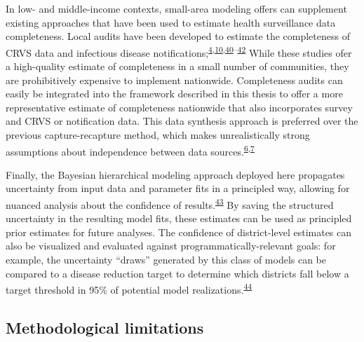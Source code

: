 \documentclass[
]{article}
\begin{document}
In low- and middle-income contexts, small-area modeling offers can supplement existing approaches that have been used to estimate health surveillance data completeness. Local audits have been developed to estimate the completeness of CRVS data and infectious disease notifications;\textsuperscript{\protect\hyperlink{ref-DeFrias2013}{4},\protect\hyperlink{ref-Hernandez2012}{10},\protect\hyperlink{ref-Szwarcwald2014}{40}--\protect\hyperlink{ref-NationalAdminstrativeDepartmentofStatisticsDANE2006}{42}} While these studies ofer a high-quality estimate of completeness in a small number of communities, they are prohibitively expensive to implement nationwide. Completeness audits can easily be integrated into the framework described in this thesis to offer a more representative estimate of completeness nationwide that also incorporates survey and CRVS or notification data. This data synthesis approach is preferred over the previous capture-recapture method, which makes unrealistically strong assumptions about independence between data sources.\textsuperscript{\protect\hyperlink{ref-Tilling2001}{6},\protect\hyperlink{ref-Cormack1999}{7}}

Finally, the Bayesian hierarchical modeling approach deployed here propagates uncertainty from input data and parameter fits in a principled way, allowing for nuanced analysis about the confidence of results.\textsuperscript{\protect\hyperlink{ref-McElreath2016}{43}} By saving the structured uncertainty in the resulting model fits, these estimates can be used as principled prior estimates for future analyses. The confidence of district-level estimates can also be visualized and evaluated against programmatically-relevant goals: for example, the uncertainty ``draws'' generated by this class of models can be compared to a disease reduction target to determine which districts fall below a target threshold in 95\% of potential model realizations.\textsuperscript{\protect\hyperlink{ref-Patil2011}{44}}

\hypertarget{methodological-limitations}{%
\subsection{Methodological limitations}\label{methodological-limitations}}
\end{document}
